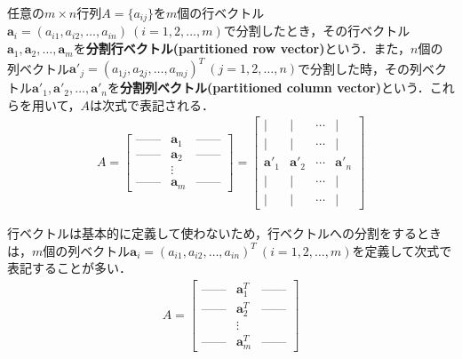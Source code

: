 \begin{defi}[分割ベクトル]
任意の$m\times n$行列$A=\{a_{ij}\}$を$m$個の行ベクトル${\bm a}_i=(a_{i1},a_{i2},\ldots,a_{in})~(i=1,2,\ldots,m)$で分割したとき，その行ベクトル${\bm a}_1,{\bm a}_2,\ldots,{\bm a}_m$を{\bf 分割行ベクトル(partitioned row vector)}という．また，$n$個の列ベクトル${\bm a}'_j=(a_{1j},a_{2j},\ldots,a_{mj})^T~(j=1,2,\ldots,n)$で分割した時，その列ベクトル${\bm a}'_1,{\bm a}'_2,\ldots,{\bm a}'_n$を{\bf 分割列ベクトル(partitioned column vector)}という．これらを用いて，$A$は次式で表記される．
\begin{align}
A=
\begin{bmatrix}
\mbox{------} & {\bm a}_1 & \mbox{------} \\
\mbox{------} & {\bm a}_2 & \mbox{------} \\
 & \vdots & \\
\mbox{------} & {\bm a}_m & \mbox{------}
\end{bmatrix}	
=
\begin{bmatrix}
| & | & \cdots & | \\[-2pt]
| & | & \cdots & | \\
{\bm a}'_1 & {\bm a}'_2 & \cdots & {\bm a}'_n \\
| & | & \cdots & |	\\[-2pt]
| & | & \cdots & |
\end{bmatrix}
\end{align}
\end{defi}

\begin{rem}
行ベクトルは基本的に定義して使わないため，行ベクトルへの分割をするときは，$m$個の列ベクトル${\bm a}_i=(a_{i1},a_{i2},\ldots,a_{in})^T~(i=1,2,\ldots,m)$を定義して次式で表記することが多い．
\begin{align}
A=
\begin{bmatrix}
\mbox{------} & {\bm a}_1^T & \mbox{------} \\
\mbox{------} & {\bm a}_2^T & \mbox{------} \\
 & \vdots & \\
\mbox{------} & {\bm a}_m^T & \mbox{------}
\end{bmatrix}	
\end{align}
\end{rem}


